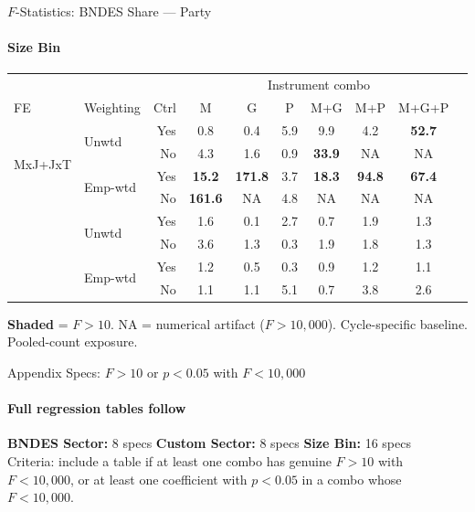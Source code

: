 \documentclass[aspectratio=169,10pt]{beamer}
\newcommand{\fpass}[1]{\cellcolor{pass}\textbf{#1}}
\begin{document}
\begin{frame}[t]{$F$-Statistics: BNDES Share --- Party}
\framesubtitle{Size Bin}
\begin{center}
\footnotesize
\setlength{\tabcolsep}{3.5pt}
\renewcommand{\arraystretch}{1.05}
\begin{tabular}{@{}llrccccccc@{}}
\toprule
 & & & \multicolumn{6}{c}{Instrument combo} \\
\cmidrule(l{2pt}r{2pt}){4-9}
FE & Weighting & Ctrl & M & G & P & M+G & M+P & M+G+P \\
\midrule
  \multirow{4}{*}{MxJ+JxT} & \multirow{2}{*}{Unwtd} & Yes & 0.8 & 0.4 & 5.9 & 9.9 & 4.2 & \fpass{52.7} \\
   &  & No & 4.3 & 1.6 & 0.9 & \fpass{33.9} & NA & NA \\
   & \multirow{2}{*}{Emp-wtd} & Yes & \fpass{15.2} & \fpass{171.8} & 3.7 & \fpass{18.3} & \fpass{94.8} & \fpass{67.4} \\
   &  & No & \fpass{161.6} & NA & 4.8 & NA & NA & NA \\
\addlinespace[5pt]
  \multirow{4}{*}{MxJ+MxT} & \multirow{2}{*}{Unwtd} & Yes & 1.6 & 0.1 & 2.7 & 0.7 & 1.9 & 1.3 \\
   &  & No & 3.6 & 1.3 & 0.3 & 1.9 & 1.8 & 1.3 \\
   & \multirow{2}{*}{Emp-wtd} & Yes & 1.2 & 0.5 & 0.3 & 0.9 & 1.2 & 1.1 \\
   &  & No & 1.1 & 1.1 & 5.1 & 0.7 & 3.8 & 2.6 \\
\bottomrule
\end{tabular}
\end{center}
{\scriptsize \colorbox{pass}{\textbf{Shaded}} = $F>10$. NA = numerical artifact ($F>10{,}000$). Cycle-specific baseline. Pooled-count exposure.}
\end{frame}


\begin{frame}[t]{Appendix Specs: $F>10$ or $p<0.05$ with $F<10{,}000$}
\framesubtitle{Full regression tables follow}
\begin{center}
\footnotesize
\textbf{BNDES Sector:} 8 specs \quad
\textbf{Custom Sector:} 8 specs \quad
\textbf{Size Bin:} 16 specs \quad
\\[1em]
{\scriptsize Criteria: include a table if at least one combo has genuine $F>10$ with $F<10{,}000$, or at least one coefficient with $p<0.05$ in a combo whose $F<10{,}000$.}
\end{center}
\end{frame}
\end{document}
